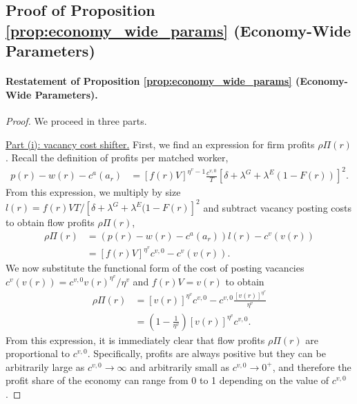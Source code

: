 \subsection{Proof of Proposition \ref{prop:economy_wide_params} (Economy-Wide Parameters)\label{app:proof_economy_wide_params}}


\paragraph{Restatement of Proposition \ref{prop:economy_wide_params} (Economy-Wide Parameters).}

%
\emph{%
    \PropEconomyWideParameters%
}%
%
\begin{proof}
    We proceed in three parts.

    \uline{Part (i): vacancy cost shifter.} %
    First, we find an expression for firm profits $\rho\Pi(r)$. Recall the definition of profits per matched worker,
    \begin{align}
        p(r) - w(r) - c^{a}(a_{r})	& = \left[f(r)V\right]^{\eta^{v}-1}\frac{c^{v,0}}{T}\left[\delta+\lambda^{G}+\lambda^{E}(1-F(r))\right]^{2}.
    \end{align}
    From this expression, we multiply by size $l(r) = f(r) V T / [\delta + \lambda^G + \lambda^E (1-F(r)]^2$ and subtract vacancy posting costs to obtain flow profits $\rho \Pi(r)$,
    \begin{align}
        \rho \Pi(r) %
        &= \left( p(r) - w(r) - c^{a}(a_{r}) \right) l(r) - c^{v} (v(r)) \\
        & = \left[ f(r)V \right]^{\eta^{v}} c^{v,0} - c^{v}(v(r)).
    \end{align}
    We now substitute the functional form of the cost of posting vacancies $c^{v}(v(r)) = c^{v,0} v(r)^{\eta^{v}}/\eta^{v}$ and $f(r)V = v(r)$ to obtain
    \begin{align}
        \rho \Pi(r) & = \left[v(r)\right]^{\eta^{v}}c^{v,0} - c^{v,0} \frac{ \left[ v(r) \right]^{\eta^{v}}}{\eta^{v}} \\
        & = \left(1 - \frac{1}{\eta^{v}} \right) \left[v(r)\right]^{\eta^{v}} c^{v,0}. \label{eq:profits_per_worker_proof}
    \end{align}
    From this expression, it is immediately clear that flow profits $\rho \Pi(r)$ are proportional to $c^{v,0}$. Specifically, profits are always positive but they can be arbitrarily large as $c^{v,0} \rightarrow \infty$ and arbitrarily small as $c^{v,0} \rightarrow 0^{+}$, and therefore the profit share of the economy can range from 0 to 1 depending on the value of $c^{v,0}$.


\end{proof}
